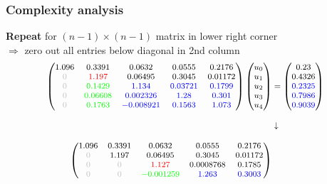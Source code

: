 \documentclass{beamer}
\begin{document}
\begin{frame}[fragile]
  \frametitle{Complexity analysis}
  \textbf{Repeat} for $(n-1)\times (n-1)$ matrix in lower right corner\\
  $\Rightarrow$ zero out all entries below diagonal in 2nd column
$$
  {\footnotesize
  \begin{aligned}
    \begin{pmatrix}
1.096 & 0.3391 & 0.0632 & 0.0555 & 0.2176\\
\textcolor{lightgray}{0} & \textcolor{red}{1.197} & \textcolor{black}{0.06495} & \textcolor{black}{0.3045} & \textcolor{black}{0.01172}\\
\textcolor{lightgray}{0} & \textcolor{green}{0.1429} & \textcolor{blue}{1.134} & \textcolor{blue}{0.03721} & \textcolor{blue}{0.1799}\\
\textcolor{lightgray}{0} & \textcolor{green}{0.06608} & \textcolor{blue}{0.002326} & \textcolor{blue}{1.28} & \textcolor{blue}{0.301}\\
\textcolor{lightgray}{0} & \textcolor{green}{0.1763} & \textcolor{blue}{-0.008921} & \textcolor{blue}{0.1563} & \textcolor{blue}{1.073}
\end{pmatrix}
\begin{pmatrix}
u_0 \\ u_1 \\ u_2 \\ u_3 \\ u_4
\end{pmatrix}
    &=  \begin{pmatrix}
0.23\\
\textcolor{black}{0.4326}\\
\textcolor{blue}{0.2325}\\
\textcolor{blue}{0.7986}\\
\textcolor{blue}{0.9039}
\end{pmatrix}\\[2ex]
&\downarrow\\[2ex]
    \begin{pmatrix}
1.096 & 0.3391 & 0.0632 & 0.0555 & 0.2176\\
\textcolor{lightgray}{0} & 1.197 & 0.06495 & 0.3045 & 0.01172\\
\textcolor{lightgray}{0} & \textcolor{lightgray}{0} & \textcolor{red}{1.127} & \textcolor{black}{0.0008768} & \textcolor{black}{0.1785}\\
\textcolor{lightgray}{0} & \textcolor{lightgray}{0} & \textcolor{green}{-0.001259} & \textcolor{blue}{1.263} & \textcolor{blue}{0.3003}\\

\end{pmatrix}
\end{aligned}}$$
\end{frame}
\end{document}
